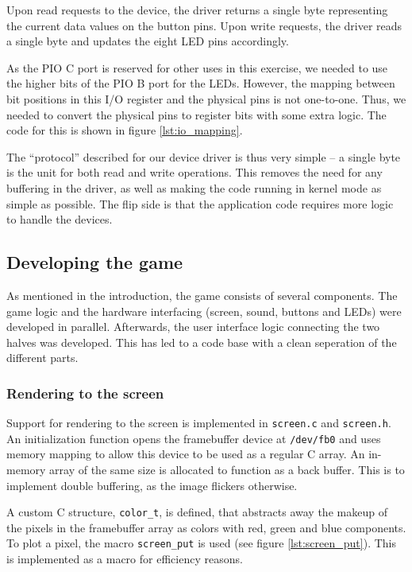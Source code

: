 Upon read requests to the device, the driver returns a single byte
representing the current data values on the button pins. Upon write
requests, the driver reads a single byte and updates the eight LED pins
accordingly.

As the PIO C port is reserved for other uses in this exercise, we needed
to use the higher bits of the PIO B port for the LEDs. However, the
mapping between bit positions in this I/O register and the physical pins
is not one-to-one. Thus, we needed to convert the physical pins to
register bits with some extra logic. The code for this is shown in
figure \ref{lst:io_mapping}.



The ``protocol'' described for our device driver is thus very simple --
a single byte is the unit for both read and write operations. This
removes the need for any buffering in the driver, as well as making the
code running in kernel mode as simple as possible. The flip side is that
the application code requires more logic to handle the devices.

\subsection{Developing the game}

As mentioned in the introduction, the game consists of several components. The
game logic and the hardware interfacing (screen, sound, buttons and
LEDs) were developed in parallel. Afterwards, the user interface logic
connecting the two halves was developed. This has led to a code base
with a clean seperation of the different parts.

\subsubsection{Rendering to the screen}

Support for rendering to the screen is implemented in \texttt{screen.c}
and \texttt{screen.h}. An initialization function opens the framebuffer
device at \texttt{/dev/fb0} and uses memory mapping to allow this device
to be used as a regular C array. An in-memory array of the same size is
allocated to function as a back buffer. This is to implement double
buffering, as the image flickers otherwise.

A custom C structure, \texttt{color\_t}, is defined, that abstracts away
the makeup of the pixels in the framebuffer array as colors with red,
green and blue components. To plot a pixel, the macro
\texttt{screen\_put} is used (see figure \ref{lst:screen_put}). This is
implemented as a macro for efficiency reasons.

